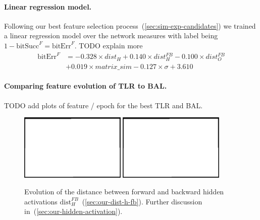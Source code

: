 \paragraph{Linear regression model.} 

Following our best feature selection process~(\ref{sec:sim-exp-candidates}) we trained a linear regression model over the network measures with label being $1-\mbox{bitSucc}^F = \mbox{bitErr}^F$. TODO explain more 
\begin{align} 
\label{eq:results-candidates-linear-regression} 
\mbox{bitErr}^F &= 
- 0.328 \times dist_{H}
+ 0.140 \times dist_{H}^{FB}
- 0.100 \times dist_{O}^{FB} \nonumber \\
&+ 0.019 \times matrix\_sim
- 0.127 \times \sigma
+ 3.610
\end{align} 

\paragraph{Comparing feature evolution of TLR to BAL.} 

TODO add plots of feature / epoch for the best TLR and BAL. 

\begin{figure}[H]
  \centering
  \includegraphics[width=0.45\textwidth]{img/placeholder.png}  %
  \includegraphics[width=0.45\textwidth]{img/placeholder.png}  %
  \caption{Evolution of the distance between forward and backward hidden activations $\mbox{dist}_{H}^{FB}$~(\ref{sec:our-dist-h-fb}). Further discussion in~(\ref{sec:our-hidden-activation}). }
  \label{fig:results-candidates-dist-h-fb}
\end{figure}

